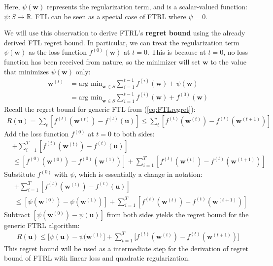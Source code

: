 \documentclass[11pt]{article}
\begin{document}
Here, $\psi (\boldsymbol{w})$ represents the regularization term, and is a scalar-valued function: $\psi : S \rightarrow \mathbb{R}$. FTL can be seen as a special case of FTRL where $\psi=0$. 

We will use this observation to derive FTRL's \textbf{regret bound} using the already derived FTL regret bound. In particular, we can treat the regularization term $\psi (\boldsymbol{w})$ as the loss function $f^{(0)} (\boldsymbol{w})$ at $t=0$. This is because at $t=0$, no loss function has been received from nature, so the minimizer will set $\boldsymbol{w}$ to the value that minimizes $\psi (\boldsymbol{w})$ only: 
\begin{align}
    \boldsymbol{w}^{(t)}&=\text{arg min}_{\boldsymbol{w}\in S} \sum_{i=1}^{t-1} f^{(i)} (\boldsymbol{w}) + \psi (\boldsymbol{w})\\
    &=\text{arg min}_{\boldsymbol{w}\in S} \sum_{i=1}^{t-1} f^{(i)} (\boldsymbol{w}) + f^{(0)} (\boldsymbol{w})
\end{align}
Recall the regret bound for generic FTL from (\ref{eq:FTLregret}):
\begin{align}
        R(\boldsymbol{u})=\sum_t [f^{(t)}(\boldsymbol{w}^{(t)})-f^{(t)}(\boldsymbol{u})]
        \leq \sum_t [f^{(t)}(\boldsymbol{w}^{(t)})-f^{(t)} (\boldsymbol{w}^{(t+1)})]
\end{align}
Add the loss function $f^{(0)}$ at $t=0$ to both sides:
\begin{align}
        [f^{(0)} (\boldsymbol{w}^{(0)})-f^{(0)} (\boldsymbol{u})]&+\sum_{i=1}^{T} [f^{(t)}(\boldsymbol{w}^{(t)})-f^{(t)}(\boldsymbol{u})]\\
        &\leq [f^{(0)} (\boldsymbol{w}^{(0)})-f^{(0)} (\boldsymbol{w}^{(1)})]+\sum_{i=1}^{T} [f^{(t)}(\boldsymbol{w}^{(t)})-f^{(t)} (\boldsymbol{w}^{(t+1)})]
\end{align}
Substitute $f^{(0)}$ with $\psi$, which is essentially a change in notation:
\begin{align}
        [\psi (\boldsymbol{w}^{(0)})-\psi (\boldsymbol{u})]&+\sum_{i=1}^{T} [f^{(t)}(\boldsymbol{w}^{(t)})-f^{(t)}(\boldsymbol{u})]\\
        &\leq [\psi (\boldsymbol{w}^{(0)})-\psi (\boldsymbol{w}^{(1)})]+\sum_{i=1}^{T} [f^{(t)}(\boldsymbol{w}^{(t)})-f^{(t)} (\boldsymbol{w}^{(t+1)})]
\end{align}
Subtract $[\psi (\boldsymbol{w}^{(0)})-\psi (\boldsymbol{u})]$ from both sides yields the regret bound for the generic FTRL algorithm:
\begin{align}
    R(\boldsymbol{u}) \leq \Big[ \psi(\boldsymbol{u}) - \psi(\boldsymbol{w}^{(1)} \Big] + \sum_{t=1}^T \Big[ f^{(t)}(\boldsymbol{w}^{(t)}) - f^{(t)}(\boldsymbol{w}^{(t+1)})\Big]
    \label{eq:FTRL_generic_regret}
\end{align}
This regret bound will be used as a intermediate step for the derivation of regret bound of FTRL with linear loss and quadratic regularization.
\end{document}
